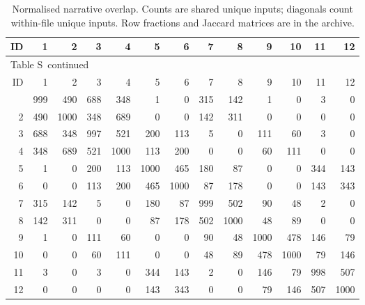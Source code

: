 \documentclass[10pt,a4paper]{article}
\renewcommand{\thetable}{S\arabic{table}}
\begin{document}
{\scriptsize
\setlength{\tabcolsep}{4pt}
\begin{longtable}{@{}rrrrrrrrrrrrr@{}}
\caption{Normalised narrative overlap. Counts are shared unique inputs; diagonals count within-file unique inputs. Row fractions and Jaccard matrices are in the archive.}\label{sup:legacy_overlap_narrative_counts}\\
\toprule
ID & 1 & 2 & 3 & 4 & 5 & 6 & 7 & 8 & 9 & 10 & 11 & 12 \\
\midrule\endfirsthead
\multicolumn{13}{l}{\small Table \thetable\ continued}\\
\toprule
ID & 1 & 2 & 3 & 4 & 5 & 6 & 7 & 8 & 9 & 10 & 11 & 12 \\
\midrule\endhead
\bottomrule\endfoot
1 & 999 & 490 & 688 & 348 & 1 & 0 & 315 & 142 & 1 & 0 & 3 & 0 \\
2 & 490 & 1000 & 348 & 689 & 0 & 0 & 142 & 311 & 0 & 0 & 0 & 0 \\
3 & 688 & 348 & 997 & 521 & 200 & 113 & 5 & 0 & 111 & 60 & 3 & 0 \\
4 & 348 & 689 & 521 & 1000 & 113 & 200 & 0 & 0 & 60 & 111 & 0 & 0 \\
5 & 1 & 0 & 200 & 113 & 1000 & 465 & 180 & 87 & 0 & 0 & 344 & 143 \\
6 & 0 & 0 & 113 & 200 & 465 & 1000 & 87 & 178 & 0 & 0 & 143 & 343 \\
7 & 315 & 142 & 5 & 0 & 180 & 87 & 999 & 502 & 90 & 48 & 2 & 0 \\
8 & 142 & 311 & 0 & 0 & 87 & 178 & 502 & 1000 & 48 & 89 & 0 & 0 \\
9 & 1 & 0 & 111 & 60 & 0 & 0 & 90 & 48 & 1000 & 478 & 146 & 79 \\
10 & 0 & 0 & 60 & 111 & 0 & 0 & 48 & 89 & 478 & 1000 & 79 & 146 \\
11 & 3 & 0 & 3 & 0 & 344 & 143 & 2 & 0 & 146 & 79 & 998 & 507 \\
12 & 0 & 0 & 0 & 0 & 143 & 343 & 0 & 0 & 79 & 146 & 507 & 1000 \\
\end{longtable}
}
\end{document}
